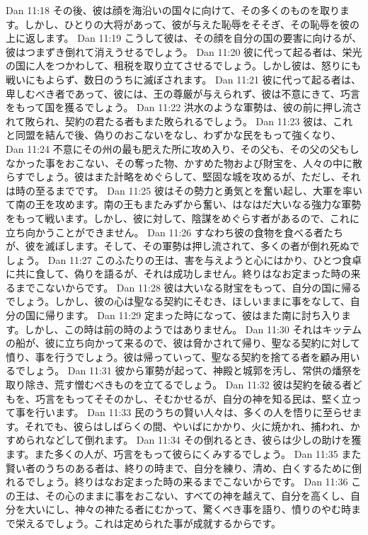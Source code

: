 Dan 11:18  その後、彼は顔を海沿いの国々に向けて、その多くのものを取ります。しかし、ひとりの大将があって、彼が与えた恥辱をそそぎ、その恥辱を彼の上に返します。
Dan 11:19  こうして彼は、その顔を自分の国の要害に向けるが、彼はつまずき倒れて消えうせるでしょう。
Dan 11:20  彼に代って起る者は、栄光の国に人をつかわして、租税を取り立てさせるでしょう。しかし彼は、怒りにも戦いにもよらず、数日のうちに滅ぼされます。
Dan 11:21  彼に代って起る者は、卑しむべき者であって、彼には、王の尊厳が与えられず、彼は不意にきて、巧言をもって国を獲るでしょう。
Dan 11:22  洪水のような軍勢は、彼の前に押し流されて敗られ、契約の君たる者もまた敗られるでしょう。
Dan 11:23  彼は、これと同盟を結んで後、偽りのおこないをなし、わずかな民をもって強くなり、
Dan 11:24  不意にその州の最も肥えた所に攻め入り、その父も、その父の父もしなかった事をおこない、その奪った物、かすめた物および財宝を、人々の中に散らすでしょう。彼はまた計略をめぐらして、堅固な城を攻めるが、ただし、それは時の至るまでです。
Dan 11:25  彼はその勢力と勇気とを奮い起し、大軍を率いて南の王を攻めます。南の王もまたみずから奮い、はなはだ大いなる強力な軍勢をもって戦います。しかし、彼に対して、陰謀をめぐらす者があるので、これに立ち向かうことができません。
Dan 11:26  すなわち彼の食物を食べる者たちが、彼を滅ぼします。そして、その軍勢は押し流されて、多くの者が倒れ死ぬでしょう。
Dan 11:27  このふたりの王は、害を与えようと心にはかり、ひとつ食卓に共に食して、偽りを語るが、それは成功しません。終りはなお定まった時の来るまでこないからです。
Dan 11:28  彼は大いなる財宝をもって、自分の国に帰るでしょう。しかし、彼の心は聖なる契約にそむき、ほしいままに事をなして、自分の国に帰ります。
Dan 11:29  定まった時になって、彼はまた南に討ち入ります。しかし、この時は前の時のようではありません。
Dan 11:30  それはキッテムの船が、彼に立ち向かって来るので、彼は脅かされて帰り、聖なる契約に対して憤り、事を行うでしょう。彼は帰っていって、聖なる契約を捨てる者を顧み用いるでしょう。
Dan 11:31  彼から軍勢が起って、神殿と城郭を汚し、常供の燔祭を取り除き、荒す憎むべきものを立てるでしょう。
Dan 11:32  彼は契約を破る者どもを、巧言をもってそそのかし、そむかせるが、自分の神を知る民は、堅く立って事を行います。
Dan 11:33  民のうちの賢い人々は、多くの人を悟りに至らせます。それでも、彼らはしばらくの間、やいばにかかり、火に焼かれ、捕われ、かすめられなどして倒れます。
Dan 11:34  その倒れるとき、彼らは少しの助けを獲ます。また多くの人が、巧言をもって彼らにくみするでしょう。
Dan 11:35  また賢い者のうちのある者は、終りの時まで、自分を練り、清め、白くするために倒れるでしょう。終りはなお定まった時の来るまでこないからです。
Dan 11:36  この王は、その心のままに事をおこない、すべての神を越えて、自分を高くし、自分を大いにし、神々の神たる者にむかって、驚くべき事を語り、憤りのやむ時まで栄えるでしょう。これは定められた事が成就するからです。
